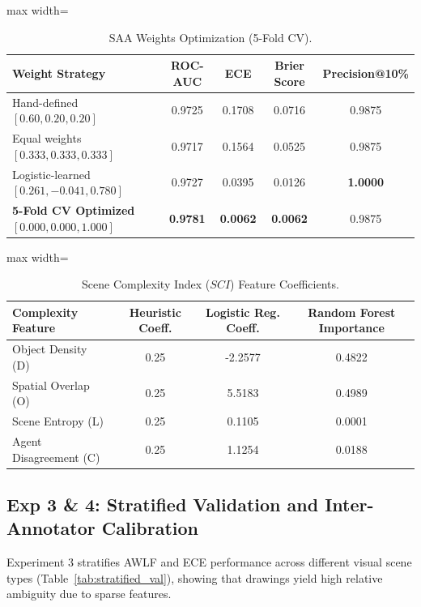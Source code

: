 \documentclass[11pt,a4paper]{article}
\begin{document}
\begin{table}[htbp]
\centering
\caption{SAA Weights Optimization (5-Fold CV).}
\label{tab:saa_weights}
\begin{adjustbox}{max width=\linewidth}
\begin{tabular}{lcccc}
\toprule
\textbf{Weight Strategy} & \textbf{ROC-AUC} & \textbf{ECE} & \textbf{Brier Score} & \textbf{Precision@10\%} \\
\midrule
Hand-defined $[0.60, 0.20, 0.20]$ & 0.9725 & 0.1708 & 0.0716 & 0.9875 \\
Equal weights $[0.333, 0.333, 0.333]$ & 0.9717 & 0.1564 & 0.0525 & 0.9875 \\
Logistic-learned $[0.261, -0.041, 0.780]$ & 0.9727 & 0.0395 & 0.0126 & \textbf{1.0000} \\
\textbf{5-Fold CV Optimized $[0.000, 0.000, 1.000]$} & \textbf{0.9781} & \textbf{0.0062} & \textbf{0.0062} & 0.9875 \\
\bottomrule
\end{tabular}
\end{adjustbox}
\end{table}

\begin{table}[htbp]
\centering
\caption{Scene Complexity Index ($SCI$) Feature Coefficients.}
\label{tab:sci_weights}
\begin{adjustbox}{max width=\linewidth}
\begin{tabular}{lccc}
\toprule
\textbf{Complexity Feature} & \textbf{Heuristic Coeff.} & \textbf{Logistic Reg. Coeff.} & \textbf{Random Forest Importance} \\
\midrule
Object Density (D) & 0.25 & -2.2577 & 0.4822 \\
Spatial Overlap (O) & 0.25 & 5.5183 & 0.4989 \\
Scene Entropy (L) & 0.25 & 0.1105 & 0.0001 \\
Agent Disagreement (C) & 0.25 & 1.1254 & 0.0188 \\
\bottomrule
\end{tabular}
\end{adjustbox}
\end{table}

\subsection{Exp 3 \& 4: Stratified Validation and Inter-Annotator Calibration}\label{sec:stratified_validation}
Experiment 3 stratifies AWLF and ECE performance across different visual scene types (Table~\ref{tab:stratified_val}), showing that drawings yield high relative ambiguity due to sparse features.
\end{document}
